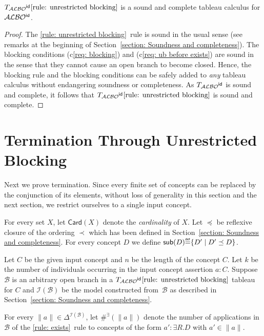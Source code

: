 \documentclass[leqno
,pdflatex
,prodmode
,acmtocl
]{acmsmall}
\makeatletter
\newcommand{\mathcmd}[1]{\ensuremath{#1}\xspace}
\newcommand{\dlfont}{\mathcal}
\newcommand{\dl}[1]{\mathcmd{\dlfont{#1}}}
\newcommand{\idRole}{\mathcmd{\textsf{\upshape\mdseries id}}}
\newcommand{\ALBOid}{\dl{ALBO\smash[t]{\mbox{${}^{\idRole}$}}}}
\newcommand{\sub}{\mathcmd{\textsf{\upshape sub}}}
\newcommand{\metasmbfont}{\mathsf}
\newcommand{\Card}{\mathcmd{\metasmbfont{Card}}}
\def\@define#1{\mathcmd{\stackrel {\mbox{\tiny\ensuremath{\metasmbfont{def}}}}{{#1}}}}
\def\sm@shdefine#1{\smash[t]{\@define{#1}}}
\newcommand{\define}{\mathchoice{\@define{\ =\ }}{\sm@shdefine{=}}{\sm@shdefine{=}}{\sm@shdefine{=}}}
\newcommand{\branch}[1]{\seg{#1}}
\newcommand{\seg}[1]{\mathcmd{\mathcal{#1}}}
\newcommand{\indiv}{a}
\newcommand{\I}{\mathcal{I}}
\newcommand{\TALBOidub}{\mathcmd{T_\ALBOid\eqref{rule: unrestricted blocking}}}
\newcommand{\napplE}{\#^\exists}
\newcommand{\IB}{{\I(\branch{B})}}
\makeatother
\begin{document}
\begin{theorem}
 \TALBOidub is a sound and complete tableau calculus for \ALBOid.
\end{theorem}
\begin{proof}
The \eqref{rule: unrestricted blocking}~rule is sound in the usual
sense (see remarks at the beginning of Section~\ref{section: Soundness and completeness}).
The blocking conditions (c\ref{req: blocking}) and (c\ref{req: ub before exists}) are sound in the sense that
they cannot cause an open branch to become closed.
Hence, the blocking rule and the blocking conditions can be safely
added to \emph{any} tableau calculus without endangering soundness
or completeness.
As $T_\ALBOid$ is sound and complete, it follows that $\TALBOidub$
is sound and complete.
\end{proof}

\section{Termination Through Unrestricted Blocking}
\label{section_termination}

Next we prove termination.
Since every finite set of concepts can be replaced by the conjunction
of its elements, without loss of generality in this section and the
next section, we restrict ourselves to a single input concept.

For every set $X$, let $\Card(X)$ denote the \emph{cardinality} of $X$. 
Let $\preceq$ be reflexive closure of the ordering $\prec$ which has been defined in Section~\ref{section: Soundness and completeness}.
For every concept $D$ we define $\sub(D)\define\{D'\mid D'\preceq D\}$.

Let $C$ be the given input concept and $n$ be the length of the concept $C$. Let $k$ be the number of individuals occurring in the input concept assertion $\indiv:C$.
Suppose $\branch{B}$ is an arbitrary open branch in a $\TALBOidub$ tableau
for $C$ and $\IB$ be the model constructed
from~$\branch{B}$ as described in Section~\ref{section: Soundness and completeness}.

For every $\|\indiv\|\in\Delta^\IB$, let $\napplE(\|\indiv\|)$
denote the number of applications in $\branch{B}$ of the \eqref{rule: exists}~rule
to concepts of the form $\indiv':\exists R.D$
with $\indiv'\in\|\indiv\|$.
\end{document}
